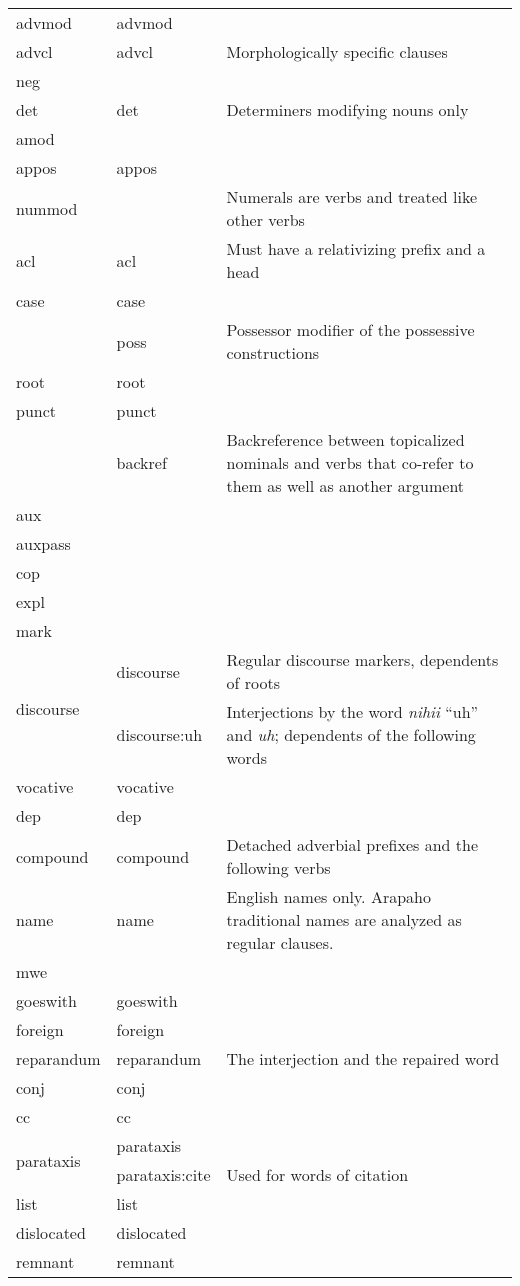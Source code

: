 \documentclass[11pt]{article}
\newcommand{\cmark}{\ding{51}}%
\newcommand{\xmark}{\ding{55}}%
\begin{document}
\begin{table}[!ht]
\begin{tabular}{l l p{4in}}
\hline
advmod & advmod & \cmark \\
advcl & advcl & Morphologically specific clauses \\
neg & \xmark & \\
\hline
det & det & Determiners modifying nouns only\\
amod & \xmark  & \\
appos & appos & \cmark \\
nummod & \xmark & Numerals are verbs and treated like other verbs \\
acl & acl & Must have a relativizing prefix and a head \\
case & case & \cmark \\
\xmark & poss & Possessor modifier of the possessive constructions\\
\hline
root & root & \cmark \\
punct & punct & \cmark \\
\xmark & backref & Backreference between topicalized nominals and verbs that co-refer to them as well as another argument\\
aux & \xmark & \\
auxpass & \xmark & \\
cop & \xmark & \\
\hline
expl & \xmark & \\
mark & \xmark & \\
\multirow {2}{*}{discourse} & discourse & Regular discourse markers, dependents of roots\\
& discourse:uh & Interjections by the word \textit{nihii} ``uh'' and \textit{uh}; dependents of the following words\\
vocative & vocative & \cmark \\
dep & dep & \cmark \\
\hline
compound & compound & Detached adverbial prefixes and the following verbs\\
name & name & English names only. Arapaho traditional names are analyzed as regular clauses. \\
mwe & \xmark & \\
goeswith & goeswith & \cmark \\
foreign & foreign & \cmark \\
reparandum & reparandum & The interjection and the repaired word\\
\hline
conj & conj & \cmark \\
cc & cc & \cmark \\
\multirow {2}{*}{parataxis} & parataxis & \cmark \\
& parataxis:cite & Used for words of citation \\
list & list & \cmark \\
dislocated & dislocated & \cmark \\
remnant & remnant & \cmark \\
\hline
\end{tabular}
\end{table}
\end{document}
